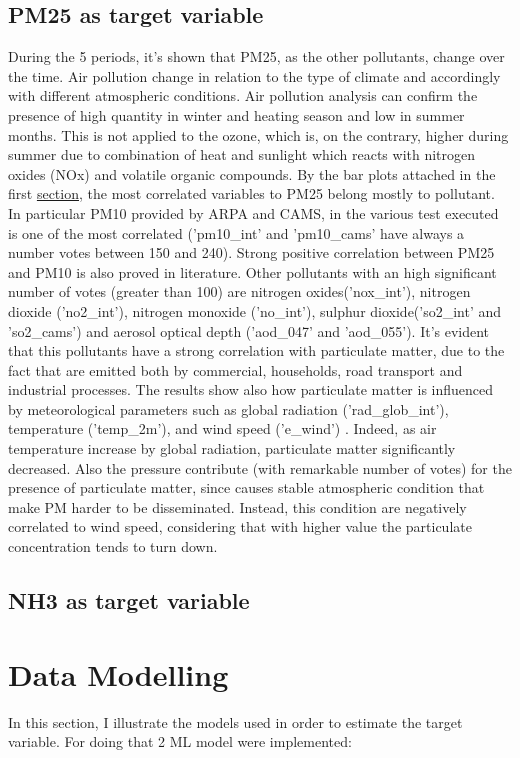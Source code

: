 \subsection{PM25 as target variable}
During the 5 periods, it's shown that PM25, as the other pollutants, change over the time. Air pollution change in relation to the type of climate and accordingly with different atmospheric conditions.
Air pollution analysis can confirm the presence of high quantity in winter and heating season and low in summer months\cite{cichowicz2017dispersion}. This is not applied to the ozone, which is, on the contrary, higher during summer due to combination of heat and sunlight which reacts with nitrogen oxides (NOx) and volatile organic compounds.
By the bar plots attached in the first \hyperref[sec:pm25]{section}, the most correlated variables to PM25 belong mostly to pollutant. In particular PM10 provided by ARPA and CAMS, in the various test executed is one of the most correlated ('pm10\_int' and 'pm10\_cams' have always a number votes between 150 and 240). Strong positive correlation between PM25 and PM10 is also proved in literature\cite{zhou2016concentrations}. 
Other pollutants with an high significant number of votes (greater than 100) are nitrogen oxides('nox\_int'), nitrogen dioxide ('no2\_int'), nitrogen monoxide ('no\_int'), sulphur dioxide('so2\_int' and 'so2\_cams') and aerosol optical depth ('aod\_047' and 'aod\_055'). It's evident that this pollutants have a strong correlation with particulate matter, due to the fact that are emitted both by commercial, households, road transport and industrial processes\cite{maranzano2022air}.
The results show also how particulate matter is influenced by meteorological parameters such as global radiation ('rad\_glob\_int'), temperature ('temp\_2m'), and wind speed ('e\_wind') . 
Indeed, as air temperature increase by global radiation, particulate matter significantly decreased\cite{li2015particulate}. 
Also the pressure contribute (with remarkable number of votes) for the presence of particulate matter, since causes stable atmospheric condition that make PM harder to be disseminated. Instead, this condition are negatively correlated to wind speed, considering that with higher value the particulate concentration tends to turn down.
\subsection{NH3 as target variable}




\section{Data Modelling}
In this section, I illustrate the models used in order to estimate the target variable. For doing that 2 ML model were implemented:

